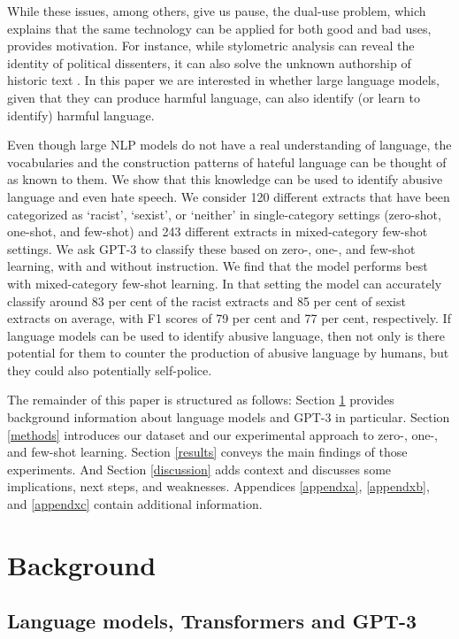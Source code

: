\documentclass[12pt,]{article}
\begin{document}
While these issues, among others, give us pause, the dual-use problem, which explains that the same technology can be applied for both good and bad uses, provides motivation. For instance, while stylometric analysis can reveal the identity of political dissenters, it can also solve the unknown authorship of historic text \citep{hovy2016social}. In this paper we are interested in whether large language models, given that they can produce harmful language, can also identify (or learn to identify) harmful language.

Even though large NLP models do not have a real understanding of language, the vocabularies and the construction patterns of hateful language can be thought of as known to them. We show that this knowledge can be used to identify abusive language and even hate speech. We consider 120 different extracts that have been categorized as `racist', `sexist', or `neither' in single-category settings (zero-shot, one-shot, and few-shot) and 243 different extracts in mixed-category few-shot settings. We ask GPT-3 to classify these based on zero-, one-, and few-shot learning, with and without instruction. We find that the model performs best with mixed-category few-shot learning. In that setting the model can accurately classify around 83 per cent of the racist extracts and 85 per cent of sexist extracts on average, with F1 scores of 79 per cent and 77 per cent, respectively. If language models can be used to identify abusive language, then not only is there potential for them to counter the production of abusive language by humans, but they could also potentially self-police.

The remainder of this paper is structured as follows: Section \ref{background} provides background information about language models and GPT-3 in particular. Section \ref{methods} introduces our dataset and our experimental approach to zero-, one-, and few-shot learning. Section \ref{results} conveys the main findings of those experiments. And Section \ref{discussion} adds context and discusses some implications, next steps, and weaknesses. Appendices \ref{appendxa}, \ref{appendxb}, and \ref{appendxc} contain additional information.

\hypertarget{background}{%
\section{Background}\label{background}}

\hypertarget{language-models-transformers-and-gpt-3}{%
\subsection{Language models, Transformers and GPT-3}\label{language-models-transformers-and-gpt-3}}
\end{document}
